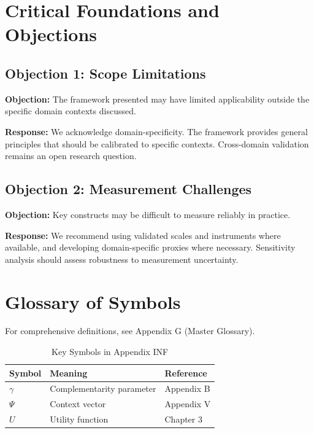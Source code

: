 \section{Critical Foundations and Objections}
\label{sec:inf-foundations}

\subsection{Objection 1: Scope Limitations}

\textbf{Objection:} The framework presented may have limited applicability
outside the specific domain contexts discussed.

\textbf{Response:} We acknowledge domain-specificity. The framework provides
general principles that should be calibrated to specific contexts. Cross-domain
validation remains an open research question.

\subsection{Objection 2: Measurement Challenges}

\textbf{Objection:} Key constructs may be difficult to measure reliably in
practice.

\textbf{Response:} We recommend using validated scales and instruments where
available, and developing domain-specific proxies where necessary. Sensitivity
analysis should assess robustness to measurement uncertainty.



\section{Glossary of Symbols}
\label{sec:inf-glossary}

For comprehensive definitions, see Appendix G (Master Glossary).

\begin{table}[htbp]
\centering
\caption{Key Symbols in Appendix INF}
\begin{tabular}{lll}
\toprule
\textbf{Symbol} & \textbf{Meaning} & \textbf{Reference} \\
\midrule
$\gamma$ & Complementarity parameter & Appendix B \\
$\Psi$ & Context vector & Appendix V \\
$U$ & Utility function & Chapter 3 \\
\bottomrule
\end{tabular}
\end{table}


